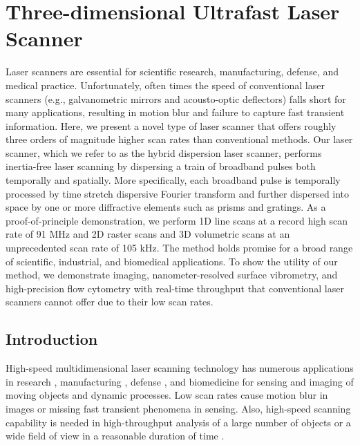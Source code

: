 \chapter{Three-dimensional Ultrafast Laser Scanner}
\label{chp:PW2013_Chapter}

Laser scanners are essential for scientific research, manufacturing, defense, and medical practice. Unfortunately, often times the speed of conventional laser scanners (e.g., galvanometric mirrors and acousto-optic deflectors) falls short for many applications, resulting in motion blur and failure to capture fast transient information. Here, we present a novel type of laser scanner that offers roughly three orders of magnitude higher scan rates than conventional methods. Our laser scanner, which we refer to as the hybrid dispersion laser scanner, performs inertia-free laser scanning by dispersing a train of broadband pulses both temporally and spatially. More specifically, each broadband pulse is temporally processed by time stretch dispersive Fourier transform and further dispersed into space by one or more diffractive elements such as prisms and gratings. As a proof-of-principle demonstration, we perform 1D line scans at a record high scan rate of 91 MHz and 2D raster scans and 3D volumetric scans at an unprecedented scan rate of 105 kHz. The method holds promise for a broad range of scientific, industrial, and biomedical applications. To show the utility of our method, we demonstrate imaging, nanometer-resolved surface vibrometry, and high-precision flow cytometry with real-time throughput that conventional laser scanners cannot offer due to their low scan rates.

\section{Introduction}

High-speed multidimensional laser scanning technology has numerous applications in research \cite{marshall2011handbook,fujii2005laser,dotson2003fundamentals,popescu2006optical,gobel2006imaging,pawley2010handbook,denk1990two,wandinger2005lidar}, manufacturing \cite{marshall2011handbook,fujii2005laser,dotson2003fundamentals,schwarz2010mapping,sinha2010vibration,pelesko2002modeling,osten2006optical,horn1986robot}, defense \cite{marshall2011handbook,fujii2005laser,schwarz2010mapping,sinha2010vibration,horn1986robot}, and biomedicine\cite{marshall2011handbook, popescu2006optical,gobel2006imaging,pawley2010handbook,denk1990two,hoffman2006confocal,tarnok2002clinical,vacca2009laser} for sensing and imaging of moving objects and dynamic processes. Low scan rates cause motion blur in images or missing fast transient phenomena in sensing. Also, high-speed scanning capability is needed in high-throughput analysis of a large number of objects or a wide field of view in a reasonable duration of time \cite{marshall2011handbook,fujii2005laser,dotson2003fundamentals,wandinger2005lidar,horn1986robot,hoffman2006confocal,tarnok2002clinical,vacca2009laser,mahjoubfar2011high}.

